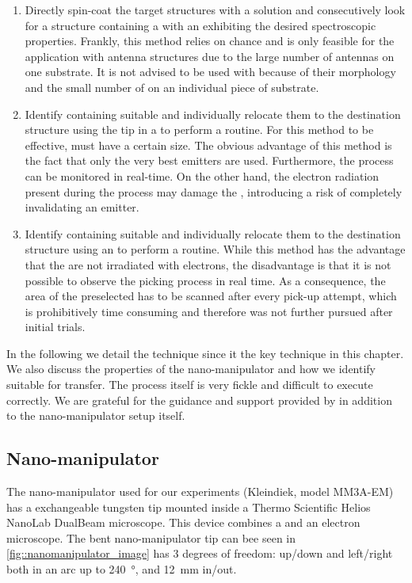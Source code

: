 	\begin{enumerate}
		\item Directly spin-coat the target structures with a \nd solution and consecutively look for a structure containing a \nd with an \siv exhibiting the desired spectroscopic properties. Frankly, this method relies on chance and is only feasible for the application with antenna structures due to the large number of antennas on one substrate. It is not advised to be used with \VCSELs because of their morphology and the small number of \VCSELs on an individual piece of substrate.

		\item Identify \nds containing suitable \sivs and individually relocate them to the destination structure using the tip in a \sem to perform a \pp routine. For this method to be effective, \nds must have a certain size. The obvious advantage of this method is the fact that only the very best emitters are used. Furthermore, the \pp process can be monitored in real-time. On the other hand, the electron radiation present during the \pp process may damage the \siv, introducing a risk of completely invalidating an emitter.

		\item Identify \nds containing suitable \sivs and individually relocate them to the destination structure using an \afm to perform a \pp routine. While this method has the advantage that the \nds are not irradiated with electrons, the disadvantage is that it is not possible to  observe the picking process in real time. As a consequence, the area of the preselected \nd has to be scanned after every pick-up attempt, which is prohibitively time consuming and therefore was not further pursued after initial trials.
	\end{enumerate}

		In the following we detail the \pp technique since it the key technique in this chapter. We also discuss the properties of the nano-manipulator and how we identify \nds suitable for \pp transfer. The \pp process itself is very fickle and difficult to execute correctly. We are grateful for the guidance and support provided by \pauly in addition to the nano-manipulator setup itself.
		\\
	\subsection{Nano-manipulator} \label{subsec::nanomanipulator}

		The nano-manipulator used for our experiments (Kleindiek, model MM3A-EM) has a exchangeable tungsten tip
	  mounted inside a Thermo Scientific\texttrademark{} Helios NanoLab\texttrademark{} DualBeam\texttrademark{} microscope. This device combines a \fib and an electron microscope.
		The bent nano-manipulator tip can bee seen in \cref{fig::nanomanipulator_image} has $3$ degrees of freedom: up/down and left/right both in an arc up to \SI{240}{\degree}, and \SI{12}{\milli\metre} in/out.

